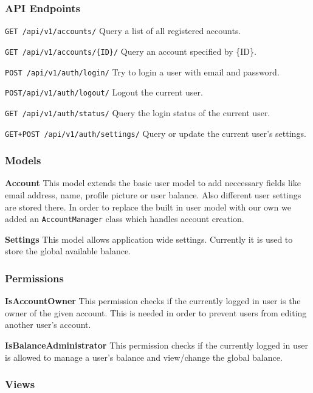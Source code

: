 \subsubsection{API Endpoints}\label{api-endpoints}

\texttt{GET\ /api/v1/accounts/} Query a list of all registered accounts.

\texttt{GET\ /api/v1/accounts/\{ID\}/} Query an account specified by
\{ID\}.

\texttt{POST\ /api/v1/auth/login/} Try to login a user with email and
password.

\texttt{POST/api/v1/auth/logout/} Logout the current user.

\texttt{GET\ /api/v1/auth/status/} Query the login status of the current
user.

\texttt{GET+POST\ /api/v1/auth/settings/} Query or update the current
user's settings.

\subsubsection{Models}\label{models-2}

\textbf{Account} This model extends the basic user model to add
neccessary fields like email address, name, profile picture or user
balance. Also different user settings are stored there. In order to
replace the built in user model with our own we added an
\texttt{AccountManager} class which handles account creation.

\textbf{Settings} This model allows application wide settings. Currently
it is used to store the global available balance.

\subsubsection{Permissions}\label{permissions-1}

\textbf{IsAccountOwner} This permission checks if the currently logged
in user is the owner of the given account. This is needed in order to
prevent users from editing another user's account.

\textbf{IsBalanceAdministrator} This permission checks if the currently
logged in user is allowed to manage a user's balance and view/change the
global balance.

\subsubsection{Views}\label{views-2}

